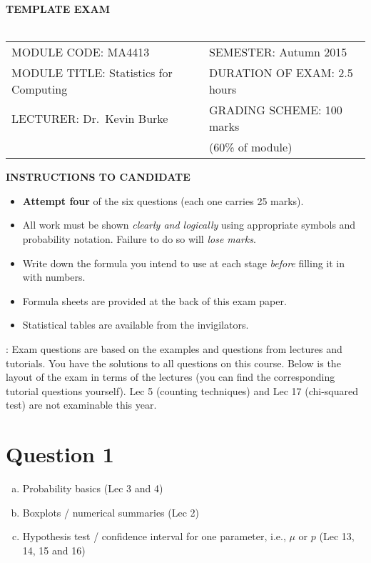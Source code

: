 \documentclass[12pt]{article}
\begin{document}
\begin{center}
{\bf\Huge TEMPLATE EXAM\\[0.5cm]}
\quad\\[1cm]
\begin{adjustwidth}{-1cm}{0cm}
\begin{tabular}{l@{\qquad}l}
MODULE CODE: MA4413&SEMESTER: Autumn 2015\\[1cm]
MODULE TITLE: Statistics for Computing& DURATION OF EXAM: 2.5 hours\\[1cm]
LECTURER: Dr.~Kevin Burke& GRADING SCHEME: 100 marks \\
& \hspace{3cm} (60\% of module)\\[2cm]
\end{tabular}
\end{adjustwidth}
{\bf INSTRUCTIONS TO CANDIDATE}
\end{center}
\begin{small}
\begin{itemize}\itemsep0.3cm
\item {\bf Attempt four} of the six questions (each one carries 25 marks).
\item {All work must be shown \emph{clearly and logically} using appropriate symbols and probability notation. Failure to do so will \emph{lose marks}.}
\item {Write down the formula you intend to use at each stage \emph{before} filling it in with numbers.}
\item Formula sheets are provided at the back of this exam paper.
\item Statistical tables are available from the invigilators.
\end{itemize}
\end{small}
\newpage

: Exam questions are based on the examples and questions from lectures and tutorials. You have the solutions to all questions on this course. Below is the layout of the exam in terms of the lectures (you can find the corresponding tutorial questions yourself). Lec 5 (counting techniques) and Lec 17 (chi-squared test) are not examinable this year.

\section*{Question 1}
\begin{enumerate}[a)]
\item Probability basics (Lec 3 and 4)
\item Boxplots / numerical summaries (Lec 2)
\item Hypothesis test / confidence interval for one parameter, i.e., $\mu$ or $p$ (Lec 13, 14, 15 and 16)
\end{enumerate}
\end{document}

